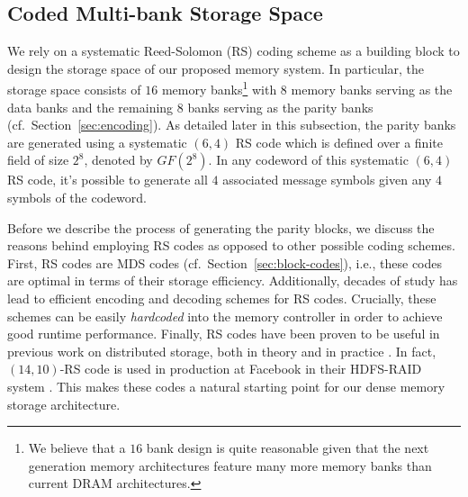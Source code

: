 \subsection{Coded Multi-bank Storage Space}
\label{sec:codedBanks}

We rely on a systematic Reed-Solomon (RS) coding scheme as a building block to design the storage space of our proposed memory system. In particular, the storage space consists of $16$ memory banks\footnote{We believe that a $16$ bank design is quite reasonable given that the next generation memory architectures feature many more memory banks than current DRAM architectures.} with $8$ memory banks serving as the data banks and the remaining $8$ banks serving as the parity banks (cf.~Section~\ref{sec:encoding}). As detailed later in this subsection, the parity banks are generated using a systematic $(6,4)$ RS code which is defined over a finite field of size $2^8$, denoted by $GF(2^{8})$.  In any codeword of this systematic $(6,4)$ RS code, it's possible to generate all $4$ associated message symbols given any $4$ symbols of the codeword. 

Before we describe the process of generating the parity blocks, we discuss the reasons behind employing RS codes as opposed to other possible coding schemes. First, RS codes are MDS codes (cf.~Section~\ref{sec:block-codes}), i.e., these codes are optimal in terms of their storage efficiency. 
 Additionally, decades of study has lead to efficient encoding and decoding schemes for RS codes. Crucially, these schemes can be easily \textit{hardcoded} into the memory controller in order to achieve good runtime performance. Finally, RS codes have been proven to be useful in previous work on distributed storage, both in theory and in practice \cite{huang,sathiamoorthy,shanmugam}. In fact, $(14,10)$-RS code is used in production at Facebook in their HDFS-RAID system \cite{sathiamoorthy}. This makes these codes a natural starting point for our dense memory storage architecture.

